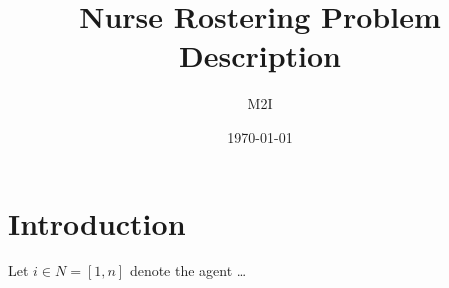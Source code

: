 \documentclass[a4paper]{article}       %
\title{Nurse Rostering Problem Description}
\author{M2I}
\date{\today}
\begin{document}
\maketitle
\tableofcontents
\listoffixmes


\abstract{

}




\section{Introduction}

Let $i \in N=[1,n]$ denote the agent \dots


\citep{burke.ea-04}


       
\end{document}

